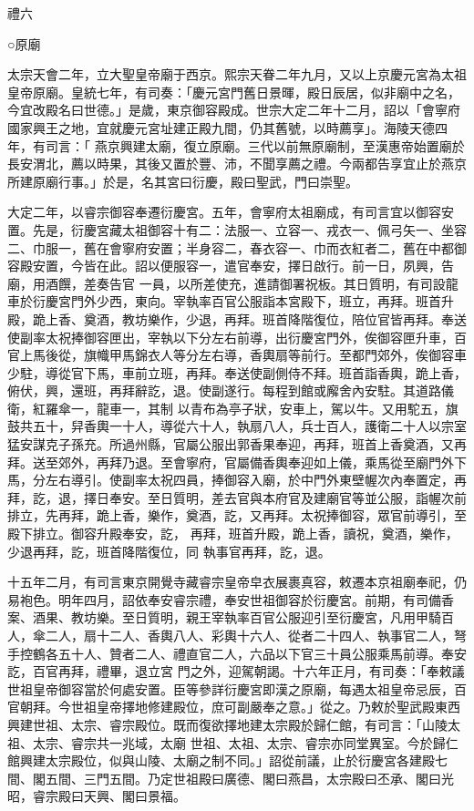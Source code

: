
\begin{pinyinscope}

 禮六



 ○原廟



 太宗天會二年，立大聖皇帝廟于西京。熙宗天眷二年九月，又以上京慶元宮為太祖皇帝原廟。皇統七年，有司奏：「慶元宮門舊日景暉，殿日辰居，似非廟中之名，今宜改殿名曰世德。」是歲，東京御容殿成。世宗大定二年十二月，詔以「會寧府國家興王之地，宜就慶元宮址建正殿九間，仍其舊號，以時薦享」。海陵天德四年，有司言：「
 燕京興建太廟，復立原廟。三代以前無原廟制，至漢惠帝始置廟於長安渭北，薦以時果，其後又置於豐、沛，不聞享薦之禮。今兩都告享宜止於燕京所建原廟行事。」於是，名其宮曰衍慶，殿曰聖武，門曰崇聖。



 大定二年，以睿宗御容奉遷衍慶宮。五年，會寧府太祖廟成，有司言宜以御容安置。先是，衍慶宮藏太祖御容十有二：法服一、立容一、戎衣一、佩弓矢一、坐容二、巾服一，舊在會寧府安置；半身容二，春衣容一、巾而衣紅者二，舊在中都御容殿安置，今皆在此。詔以便服容一，遣官奉安，擇日啟行。前一日，夙興，告廟，用酒饌，差奏告官
 一員，以所差使充，進請御署祝板。其日質明，有司設龍車於衍慶宮門外少西，東向。宰執率百官公服詣本宮殿下，班立，再拜。班首升殿，跪上香、奠酒，教坊樂作，少退，再拜。班首降階復位，陪位官皆再拜。奉送使副率太祝捧御容匣出，宰執以下分左右前導，出衍慶宮門外，俟御容匣升車，百官上馬後從，旗幟甲馬錦衣人等分左右導，香輿扇等前行。至都門郊外，俟御容車少駐，導從官下馬，車前立班，再拜。奉送使副側侍不拜。班首詣香輿，跪上香，俯伏，興，還班，再拜辭訖，退。使副遂行。每程到館或廨舍內安駐。其道路儀衛，紅羅傘一，龍車一，其制
 以青布為亭子狀，安車上，駕以牛。又用駝五，旗鼓共五十，舁香輿一十人，導從六十人，執扇八人，兵士百人，護衛二十人以宗室猛安謀克子孫充。所過州縣，官屬公服出郭香果奉迎，再拜，班首上香奠酒，又再拜。送至郊外，再拜乃退。至會寧府，官屬備香輿奉迎如上儀，乘馬從至廟門外下馬，分左右導引。使副率太祝四員，捧御容入廟，於中門外東壁幄次內奉置定，再拜，訖，退，擇日奉安。至日質明，差去官與本府官及建廟官等並公服，詣幄次前排立，先再拜，跪上香，樂作，奠酒，訖，又再拜。太祝捧御容，眾官前導引，至殿下排立。御容升殿奉安，訖，
 再拜，班首升殿，跪上香，讀祝，奠酒，樂作，少退再拜，訖，班首降階復位，同
 執事官再拜，訖，退。



 十五年二月，有司言東京開覺寺藏睿宗皇帝皁衣展裹真容，敕遷本京祖廟奉祀，仍易袍色。明年四月，詔依奉安睿宗禮，奉安世祖御容於衍慶宮。前期，有司備香案、酒果、教坊樂。至日質明，親王宰執率百官公服迎引至衍慶宮，凡用甲騎百人，傘二人，扇十二人、香輿八人、彩輿十六人、從者二十四人、執事官二人，弩手控鶴各五十人、贊者二人、禮直官二人，六品以下官三十員公服乘馬前導。奉安訖，百官再拜，禮畢，退立宮
 門之外，迎駕朝謁。十六年正月，有司奏：「奉敕議世祖皇帝御容當於何處安置。臣等參詳衍慶宮即漢之原廟，每遇太祖皇帝忌辰，百官朝拜。今世祖皇帝擇地修建殿位，庶可副嚴奉之意。」從之。乃敕於聖武殿東西興建世祖、太宗、睿宗殿位。既而復欲擇地建太宗殿於歸仁館，有司言：「山陵太祖、太宗、睿宗共一兆域，太廟
 世祖、太祖、太宗、睿宗亦同堂異室。今於歸仁館興建太宗殿位，似與山陵、太廟之制不同。」詔從前議，止於衍慶宮各建殿七間、閣五間、三門五間。乃定世祖殿曰廣德、閣曰燕昌，太宗殿曰丕承、閣曰光昭，睿宗殿曰天興、閣曰景福。




\end{pinyinscope}

